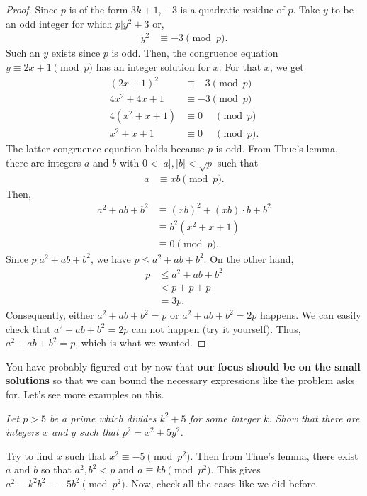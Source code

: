 \documentclass{subfile}
\begin{document}
	\begin{proof}
		Since $p$ is of the form $3k+1$, $-3$ is a quadratic residue of $p$. Take $y$ to be an odd integer for which $p|y^2+3$ or,
			\begin{align*}
				y^2 & \equiv-3\pmod p.
			\end{align*}
		Such an $y$ exists since $p$ is odd. Then, the congruence equation $y\equiv2x+1\pmod p$ has an integer solution for $x$. For that $x$, we get
			\begin{align*}
				(2x+1)^2 & \equiv-3\pmod p\\
				4x^2+4x+1& \equiv-3\pmod p\\
				4(x^2+x+1)&\equiv 0 \phantom{-}\pmod p\\
				x^2+x+1	 & \equiv 0 \phantom{-}\pmod p.
			\end{align*}
		The latter congruence equation holds because $p$ is odd. From Thue's lemma, there are integers $a$ and $b$ with $0<|a|,|b|< \sqrt p$ such that
			\begin{align*}
				a & \equiv xb\pmod p.
			\end{align*}
		Then,
			\begin{align*}
				a^2+ab+b^2  & \equiv (xb)^2+(xb)\cdot b+b^2\\
				& \equiv b^2(x^2+x+1)\\
				& \equiv 0\pmod p.
			\end{align*}
		Since $p|a^2+ab+b^2$, we have $p\leq a^2+ab+b^2$. On the other hand,
			\begin{align*}
				p& \leq a^2+ab+b^2 \\
				& < p+p+p \\
				&= 3p.
			\end{align*}
		Consequently, either $a^2+ab+b^2=p$ or $a^2+ab+b^2=2p$ happens. We can easily check that $a^2+ab+b^2=2p$ can not happen (try it yourself). Thus, $a^2+ab+b^2=p$, which is what we wanted.
	\end{proof}
	
	You have probably figured out by now that \textbf{our focus should be on the small solutions} so that we can bound the necessary expressions like the problem asks for. Let's see more examples on this.
	
	\begin{theorem}\slshape
		Let $p>5$ be a prime which divides $k^2+5$ for some integer $k$. Show that there are integers $x$ and $y$ such that $p^2=x^2+5y^2$.
	\end{theorem}
	
	\begin{hint}
		Try to find $x$ such that $x^2\equiv-5\pmod{p^2}$. Then from Thue's lemma, there exist $a$ and $b$ so that $a^2,b^2<p$ and $a\equiv kb\pmod{p^2}$. This gives $a^2\equiv k^2b^2\equiv-5b^2\pmod{p^2}$. Now, check all the cases like we did before.
	\end{hint}
	
\end{document}
